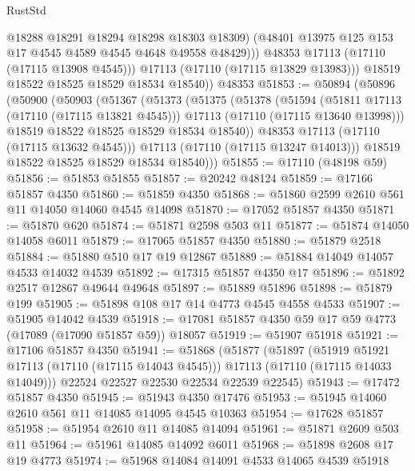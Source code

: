 \begin{lexlean}{RustStd}
\begin{coremodule}
                  @18288
                  @18291
                  @18294
                  @18298
                  @18303
                  @18309)
                (@48401 @13975 @125 @153 @17 @4545 @4589 @4545 @4648 @49558 @48429)))
            @48353
            @17113
            (@17110 (@17115 @13908 @4545)))
          @17113
          (@17110 (@17115 @13829 @13983)))
        @18519
        @18522
        @18525
        @18529
        @18534
        @18540))
    @48353
@51853 := @50894
    (@50896
      (@50900
        (@50903
          (@51367
            (@51373
              (@51375
                (@51378
                  (@51594
                    (@51811 @17113 (@17110 (@17115 @13821 @4545)))
                    @17113
                    (@17110 (@17115 @13640 @13998)))
                  @18519
                  @18522
                  @18525
                  @18529
                  @18534
                  @18540))
              @48353
              @17113
              (@17110 (@17115 @13632 @4545)))
            @17113
            (@17110 (@17115 @13247 @14013)))
          @18519
          @18522
          @18525
          @18529
          @18534
          @18540)))
@51855 := @17110 (@48198 @59)
@51856 := @51853 @51855
@51857 := @20242 @48124
@51859 := @17166 @51857 @4350
@51860 := @51859 @4350
@51868 := @51860 @2599 @2610 @561 @11 @14050 @14060 @4545 @14098
@51870 := @17052 @51857 @4350
@51871 := @51870 @620
@51874 := @51871 @2598 @503 @11
@51877 := @51874 @14050 @14058 @6011
@51879 := @17065 @51857 @4350
@51880 := @51879 @2518
@51884 := @51880 @510 @17 @19 @12867
@51889 := @51884 @14049 @14057 @4533 @14032 @4539
@51892 := @17315 @51857 @4350 @17
@51896 := @51892 @2517 @12867 @49644 @49648
@51897 := @51889 @51896
@51898 := @51879 @199
@51905 := @51898 @108 @17 @14 @4773 @4545 @4558 @4533
@51907 := @51905 @14042 @4539
@51918 := @17081 @51857 @4350 @59 @17 @59 @4773 (@17089 (@17090 @51857 @59)) @18057
@51919 := @51907 @51918
@51921 := @17106 @51857 @4350
@51941 := @51868
    (@51877
      (@51897
        (@51919 @51921 @17113 (@17110 (@17115 @14043 @4545)))
        @17113
        (@17110 (@17115 @14033 @14049)))
      @22524
      @22527
      @22530
      @22534
      @22539
      @22545)
@51943 := @17472 @51857 @4350
@51945 := @51943 @4350 @17476
@51953 := @51945 @14060 @2610 @561 @11 @14085 @14095 @4545 @10363
@51954 := @17628 @51857
@51958 := @51954 @2610 @11 @14085 @14094
@51961 := @51871 @2609 @503 @11
@51964 := @51961 @14085 @14092 @6011
@51968 := @51898 @2608 @17 @19 @4773
@51974 := @51968 @14084 @14091 @4533 @14065 @4539 @51918

\end{coremodule}
\end{lexlean}
